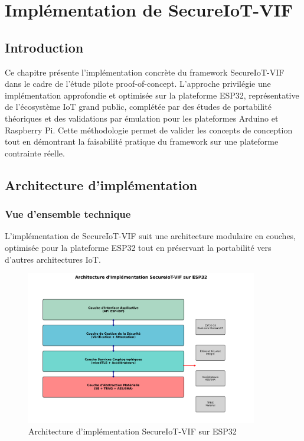 
\chapter{Implémentation de SecureIoT-VIF}
\label{chap:implementation}

\section{Introduction}

Ce chapitre présente l'implémentation concrète du framework SecureIoT-VIF dans le cadre de l'étude pilote proof-of-concept. L'approche privilégie une implémentation approfondie et optimisée sur la plateforme ESP32, représentative de l'écosystème IoT grand public, complétée par des études de portabilité théoriques et des validations par émulation pour les plateformes Arduino et Raspberry Pi. Cette méthodologie permet de valider les concepts de conception tout en démontrant la faisabilité pratique du framework sur une plateforme contrainte réelle.

\section{Architecture d'implémentation}

\subsection{Vue d'ensemble technique}

L'implémentation de SecureIoT-VIF suit une architecture modulaire en couches, optimisée pour la plateforme ESP32 tout en préservant la portabilité vers d'autres architectures IoT.

\begin{figure}[h]
    \centering
    \includegraphics[width=0.9\textwidth]{assets/figures/implementation_architecture_esp32.png}
    \caption{Architecture d'implémentation SecureIoT-VIF sur ESP32}
    \label{fig:implementation-architecture-esp32}
\end{figure}

